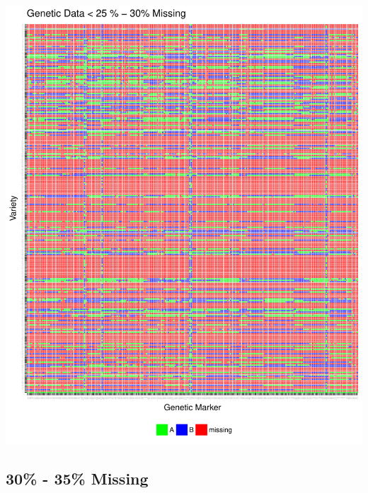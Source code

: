 \documentclass[11pt]{article}\usepackage[]{graphicx}\usepackage[]{color}
\makeatletter
\def\maxwidth{ %
  \ifdim\Gin@nat@width>\linewidth
    \linewidth
  \else
    \Gin@nat@width
  \fi
}
\newenvironment{knitrout}{}{} %
\makeatother
\begin{document}
\begin{knitrout}\footnotesize
{}\color{fgcolor}

{\centering \includegraphics[width=\maxwidth]{figure/missing_plot30-1} 

}



\end{knitrout}
\pagebreak
\subsection{30\% - 35\% Missing}
\end{document}

